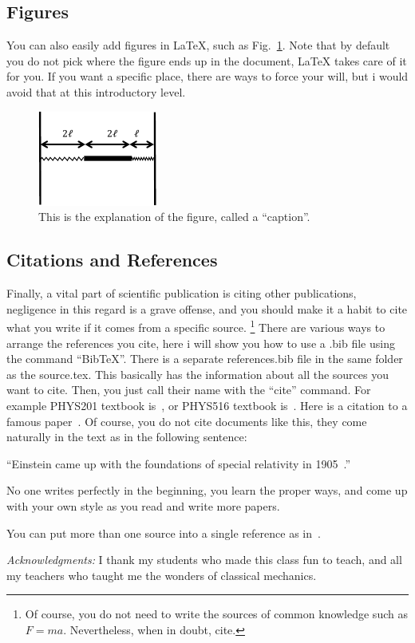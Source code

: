 \documentclass[aps,twocolumn,showpacs,preprintnumbers,nofootinbib,prl,superscriptaddress,groupedaddress]{revtex4-2}
\begin{document}
\subsection{Figures}
You can also easily add figures in LaTeX, such as Fig.~\ref{fig:rod_spring}. Note that by default you do not pick where
the figure ends up in the document, LaTeX takes care of it for you. If you want a specific place, there are ways to force
your will, but i would avoid that at this introductory level.
\begin{figure}
\includegraphics[width=0.35\textwidth]{rod_with_springs.pdf}
\caption{This is the explanation of the figure, called a ``caption''.}
\label{fig:rod_spring}
\end{figure}

\subsection{Citations and References}
Finally, a vital part of scientific publication is citing other publications, negligence in this regard is a grave offense, and
you should make it a habit to cite what you write if it comes from a specific source. \footnote{Of course, you do not
need to write the sources of common knowledge such as $F=ma$. Nevertheless, when in doubt, cite.} There are
various ways to arrange the references you cite, here i will show you how to use a .bib file using the command
``BibTeX''. There is a separate references.bib file in the same folder as the source.tex. This basically has the information
about all the sources you want to cite. Then, you just call their name with the ``cite'' command. For example PHYS201
textbook is~\cite{thornton2004classical}, or PHYS516 textbook is~\cite{Carroll:2004st}. Here is a citation to a
famous paper~\cite{Einstein:1905ve}. Of course, you do not cite documents like this, they come naturally in the text as in the following sentence:

``Einstein came up with the foundations of special relativity in 1905~\cite{Einstein:1905ve}.''

No one writes perfectly in the beginning, you learn the proper ways, and come up with your own style as you read and
write more papers.

You can put more than one source into a single reference as
in~\cite{thornton2004classical,Carroll:2004st,Einstein:1905ve}.

\textit{Acknowledgments:} I thank my students who made this class fun to teach, and all my teachers who taught me the 
wonders of classical mechanics.

\end{document}
